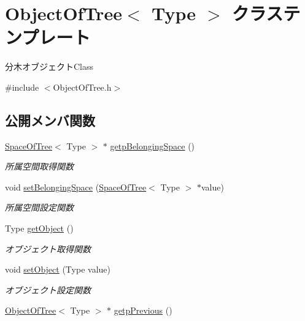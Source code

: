 \hypertarget{class_object_of_tree}{}\section{Object\+Of\+Tree$<$ Type $>$ クラステンプレート}
\label{class_object_of_tree}


分木オブジェクト\+Class  




{\ttfamily \#include $<$Object\+Of\+Tree.\+h$>$}

\subsection*{公開メンバ関数}
\begin{DoxyCompactItemize}
\item 
\mbox{\hyperlink{class_space_of_tree}{Space\+Of\+Tree}}$<$ Type $>$ $\ast$ \mbox{\hyperlink{class_object_of_tree_a18ec17e546c20124926726081733ee69}{getp\+Belonging\+Space}} ()
\begin{DoxyCompactList}\small\item\em 所属空間取得関数 \end{DoxyCompactList}\item 
void \mbox{\hyperlink{class_object_of_tree_a21dc9105d1a5a0d045dc43894bba3c1c}{set\+Belonging\+Space}} (\mbox{\hyperlink{class_space_of_tree}{Space\+Of\+Tree}}$<$ Type $>$ $\ast$value)
\begin{DoxyCompactList}\small\item\em 所属空間設定関数 \end{DoxyCompactList}\item 
Type \mbox{\hyperlink{class_object_of_tree_a28214e15fffb72cb50b764e2f3ac863d}{get\+Object}} ()
\begin{DoxyCompactList}\small\item\em オブジェクト取得関数 \end{DoxyCompactList}\item 
void \mbox{\hyperlink{class_object_of_tree_aae14cb0e8ac8b701de737c547a1d3b8c}{set\+Object}} (Type value)
\begin{DoxyCompactList}\small\item\em オブジェクト設定関数 \end{DoxyCompactList}\item 
\mbox{\hyperlink{class_object_of_tree}{Object\+Of\+Tree}}$<$ Type $>$ $\ast$ \mbox{\hyperlink{class_object_of_tree_abdacc480e98a4dbaff33b13faf2d9ab4}{getp\+Previous}} ()

\end{DoxyCompactItemize}
